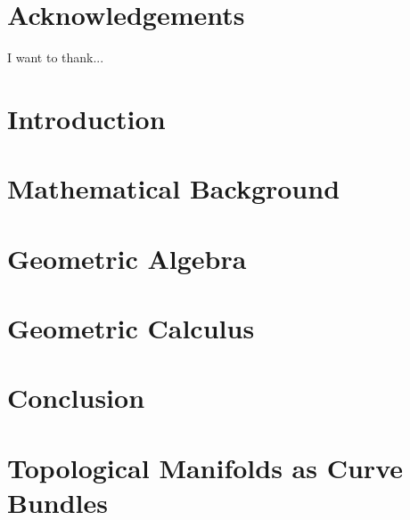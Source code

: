 \documentclass[12pt]{report}
\begin{document}




\chapter*{Acknowledgements}
I want to thank...

\tableofcontents
\listoffigures
\listoftables

\chapter{Introduction}


\chapter{Mathematical Background}


\chapter{Geometric Algebra}


\chapter{Geometric Calculus}


\chapter{Conclusion}


\appendix
\chapter{Topological Manifolds as Curve Bundles}


\printbibliography
\end{document}
